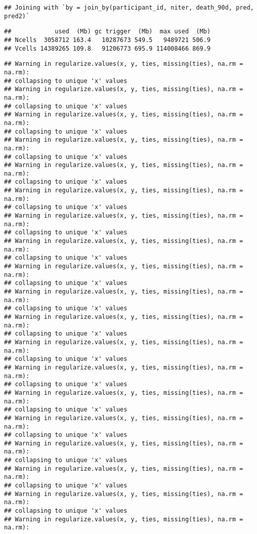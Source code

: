 \documentclass[
]{article}
\begin{document}
\begin{verbatim}
## Joining with `by = join_by(participant_id, niter, death_90d, pred, pred2)`
\end{verbatim}

\begin{verbatim}
##            used  (Mb) gc trigger  (Mb)  max used  (Mb)
## Ncells  3058712 163.4   10287673 549.5   9489721 506.9
## Vcells 14389265 109.8   91206773 695.9 114008466 869.9
\end{verbatim}

\begin{verbatim}
## Warning in regularize.values(x, y, ties, missing(ties), na.rm = na.rm):
## collapsing to unique 'x' values
## Warning in regularize.values(x, y, ties, missing(ties), na.rm = na.rm):
## collapsing to unique 'x' values
## Warning in regularize.values(x, y, ties, missing(ties), na.rm = na.rm):
## collapsing to unique 'x' values
## Warning in regularize.values(x, y, ties, missing(ties), na.rm = na.rm):
## collapsing to unique 'x' values
## Warning in regularize.values(x, y, ties, missing(ties), na.rm = na.rm):
## collapsing to unique 'x' values
## Warning in regularize.values(x, y, ties, missing(ties), na.rm = na.rm):
## collapsing to unique 'x' values
## Warning in regularize.values(x, y, ties, missing(ties), na.rm = na.rm):
## collapsing to unique 'x' values
## Warning in regularize.values(x, y, ties, missing(ties), na.rm = na.rm):
## collapsing to unique 'x' values
## Warning in regularize.values(x, y, ties, missing(ties), na.rm = na.rm):
## collapsing to unique 'x' values
## Warning in regularize.values(x, y, ties, missing(ties), na.rm = na.rm):
## collapsing to unique 'x' values
## Warning in regularize.values(x, y, ties, missing(ties), na.rm = na.rm):
## collapsing to unique 'x' values
## Warning in regularize.values(x, y, ties, missing(ties), na.rm = na.rm):
## collapsing to unique 'x' values
## Warning in regularize.values(x, y, ties, missing(ties), na.rm = na.rm):
## collapsing to unique 'x' values
## Warning in regularize.values(x, y, ties, missing(ties), na.rm = na.rm):
## collapsing to unique 'x' values
## Warning in regularize.values(x, y, ties, missing(ties), na.rm = na.rm):
## collapsing to unique 'x' values
## Warning in regularize.values(x, y, ties, missing(ties), na.rm = na.rm):
## collapsing to unique 'x' values
## Warning in regularize.values(x, y, ties, missing(ties), na.rm = na.rm):
## collapsing to unique 'x' values
## Warning in regularize.values(x, y, ties, missing(ties), na.rm = na.rm):
## collapsing to unique 'x' values
## Warning in regularize.values(x, y, ties, missing(ties), na.rm = na.rm):

\end{verbatim}
\end{document}
